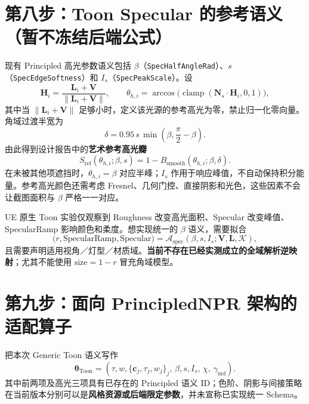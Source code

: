 \documentclass[UTF8,11pt,a4paper]{ctexart}
\newcommand{\sat}[1]{\operatorname{clamp}\!\left(#1,0,1\right)}
\newcommand{\sref}{\mathrm{ref}}
\numberwithin{equation}{section}
\begin{document}
\section{第八步：Toon Specular 的参考语义（暂不冻结后端公式）}
现有 Principled 高光参数语义包括 $\beta$（\texttt{SpecHalfAngleRad}）、$s$（\texttt{SpecEdgeSoftness}）和 $I_s$（\texttt{SpecPeakScale}）。设
\begin{equation}
\mathbf H_i=\frac{\mathbf L_i+\mathbf V}{\|\mathbf L_i+\mathbf V\|},\qquad
\theta_{h,i}=\arccos\bigl(\sat{\mathbf N_s\cdot\mathbf H_i}\bigr),
\end{equation}
其中当 $\|\mathbf L_i+\mathbf V\|$ 足够小时，定义该光源的参考高光为零，禁止归一化零向量。角域过渡半宽为
\begin{equation}
\delta=0.95\,s\,\min\!\left(\beta,\frac\pi2-\beta\right).
\end{equation}
由此得到设计报告中的\textbf{艺术参考高光瓣}
\begin{equation}
\boxed{S_{\sref}(\theta_{h,i};\beta,s)=
1-B_{\mathrm{smooth}}(\theta_{h,i};\beta,\delta).}
\label{eq:spec}
\end{equation}
在未被其他项遮挡时，$\theta_{h,i}=\beta$ 对应半峰；$I_s$ 作用于响应峰值，不自动保持积分能量。参考高光颜色还需考虑 Fresnel、几何门控、直接阴影和光色，这些因素不会让截图面积与 $\beta$ 严格一一对应。

UE 原生 Toon 实验仅观察到 Roughness 改变高光面积、Specular 改变峰值、SpecularRamp 影响颜色和柔度。想实现统一的 $\beta$ 语义，需要拟合
\begin{equation}
\bigl(r,\mathrm{SpecularRamp},\mathrm{Specular}\bigr)
=\mathcal A_{\mathrm{spec}}(\beta,s,I_s;\mathbf V,\mathbf L,\mathcal K),
\label{eq:specfit}
\end{equation}
且需要声明适用视角／灯型／材质域。\textbf{当前不存在已经实测成立的全域解析逆映射}；尤其不能使用 $\mathrm{size}=1-r$ 冒充角域模型。

\section{第九步：面向 PrincipledNPR 架构的适配算子}
把本次 Generic Toon 语义写作
\begin{equation}
\boldsymbol\theta_{\mathrm{Toon}}=
\left(\tau,w,\{\mathbf c_j,\tau_j,w_j\}_{j},
\,\beta,s,I_s,\,\chi,\,\gamma_{\mathrm{ind}}\right).
\end{equation}
其中前两项及高光三项具有已存在的 Principled 语义 ID；色阶、阴影与间接策略在当前版本分别可以是\textbf{风格资源或后端限定参数}，并未宣称已实现统一 Schema。
\end{document}
